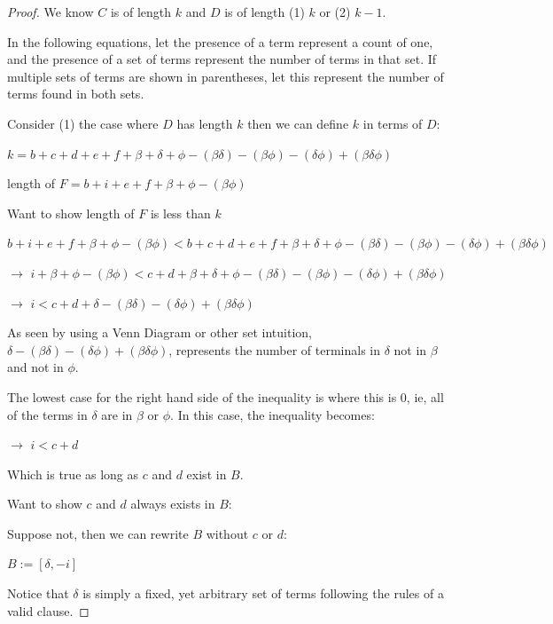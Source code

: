 \documentclass[manuscript]{acmart}
\begin{document}
\begin{proof}
        We know $C$ is of length $k$ and $D$ is of length (1) $k$ or (2) $k-1$.

        In the following equations, let the presence of a term represent a count of one,
        and the presence of a set of terms represent the number of terms in that set. If
        multiple sets of terms are shown in parentheses, let this represent the number
        of terms found in both sets.

        Consider (1) the case where $D$ has length $k$ then we can define $k$ in terms of $D$:
        
        $k = b + c + d + e + f + \beta + \delta + \phi - (\beta \delta) - 
        (\beta \phi) - (\delta \phi) + (\beta \delta \phi)$

        length of $F = b + i + e + f + \beta + \phi - (\beta \phi)$

        Want to show length of $F$ is less than $k$

        $b + i + e + f + \beta + \phi - (\beta \phi) < 
        b + c + d + e + f + \beta + \delta + \phi - (\beta \delta) - 
        (\beta \phi) - (\delta \phi) + (\beta \delta \phi)$

        $\rightarrow$ $i + \beta + \phi - (\beta \phi) < 
        c + d + \beta + \delta + \phi - (\beta \delta) - 
        (\beta \phi) - (\delta \phi) + (\beta \delta \phi)$

        $\rightarrow$ $i < 
        c + d + \delta - (\beta \delta) - (\delta \phi) + (\beta \delta \phi)$

        As seen by using a Venn Diagram or other set intuition, $\delta - 
        (\beta \delta) - (\delta \phi) + (\beta \delta \phi)$, 
        represents the number of terminals in $\delta$ not in $\beta$
        and not in $\phi$.

        The lowest case for the right hand side of the inequality is where 
        this is 0, ie, all of the terms in $\delta$ are in $\beta$ or 
        $\phi$. In this case, the inequality becomes:

        $\rightarrow$ $i < c + d$

        Which is true as long as $c$ and $d$ exist in $B$.

        Want to show $c$ and $d$ always exists in $B$:

        Suppose not, then we can rewrite $B$ without $c$ or $d$:

        $B := [\delta, -i]$

        Notice that $\delta$ is simply a fixed, yet arbitrary set of terms
        following the rules of a valid clause.


\end{proof}
\end{document}
